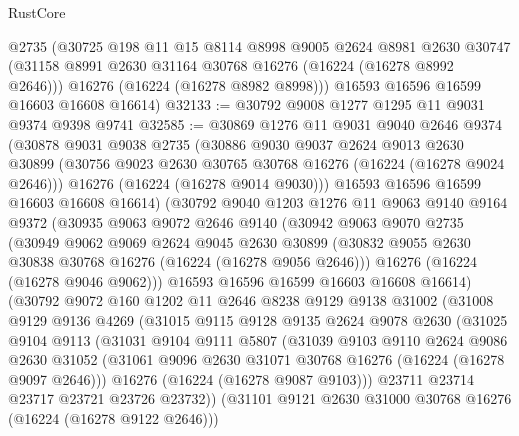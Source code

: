 \begin{lexlean}{RustCore}
\begin{coremodule}
      @2735
      (@30725
        @198
        @11
        @15
        @8114
        @8998
        @9005
        @2624
        @8981
        @2630
        @30747
        (@31158 @8991 @2630 @31164 @30768 @16276 (@16224 (@16278 @8992 @2646)))
        @16276
        (@16224 (@16278 @8982 @8998)))
      @16593
      @16596
      @16599
      @16603
      @16608
      @16614)
@32133 := @30792 @9008 @1277 @1295 @11 @9031 @9374 @9398 @9741
@32585 := @30869
    @1276
    @11
    @9031
    @9040
    @2646
    @9374
    (@30878
      @9031
      @9038
      @2735
      (@30886
        @9030
        @9037
        @2624
        @9013
        @2630
        @30899
        (@30756 @9023 @2630 @30765 @30768 @16276 (@16224 (@16278 @9024 @2646)))
        @16276
        (@16224 (@16278 @9014 @9030)))
      @16593
      @16596
      @16599
      @16603
      @16608
      @16614)
    (@30792
      @9040
      @1203
      @1276
      @11
      @9063
      @9140
      @9164
      @9372
      (@30935
        @9063
        @9072
        @2646
        @9140
        (@30942
          @9063
          @9070
          @2735
          (@30949
            @9062
            @9069
            @2624
            @9045
            @2630
            @30899
            (@30832 @9055 @2630 @30838 @30768 @16276 (@16224 (@16278 @9056 @2646)))
            @16276
            (@16224 (@16278 @9046 @9062)))
          @16593
          @16596
          @16599
          @16603
          @16608
          @16614)
        (@30792
          @9072
          @160
          @1202
          @11
          @2646
          @8238
          @9129
          @9138
          @31002
          (@31008
            @9129
            @9136
            @4269
            (@31015
              @9115
              @9128
              @9135
              @2624
              @9078
              @2630
              (@31025
                @9104
                @9113
                (@31031
                  @9104
                  @9111
                  @5807
                  (@31039
                    @9103
                    @9110
                    @2624
                    @9086
                    @2630
                    @31052
                    (@31061 @9096 @2630 @31071 @30768 @16276 (@16224 (@16278 @9097 @2646)))
                    @16276
                    (@16224 (@16278 @9087 @9103)))
                  @23711
                  @23714
                  @23717
                  @23721
                  @23726
                  @23732))
              (@31101 @9121 @2630 @31000 @30768 @16276 (@16224 (@16278 @9122 @2646)))

\end{coremodule}
\end{lexlean}
